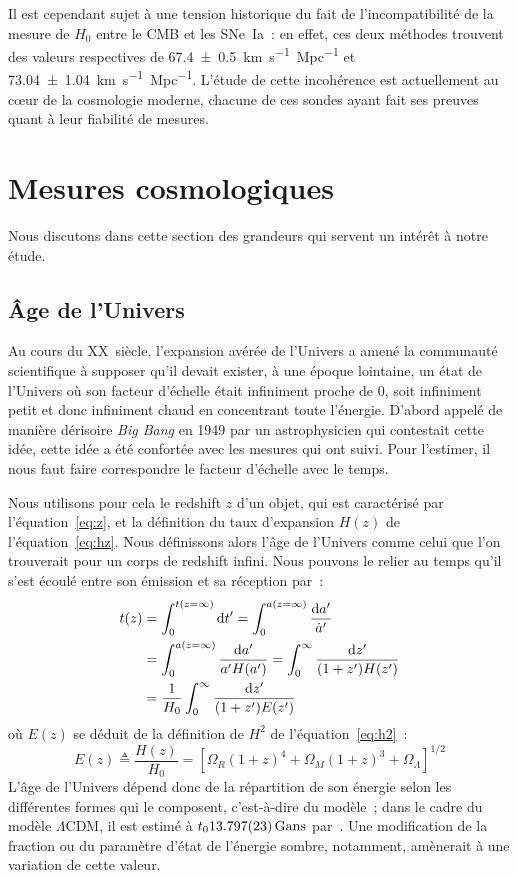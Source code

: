 \documentclass[../main/main.tex]{subfiles}
\begin{document}
Il est cependant sujet à une tension historique du fait de l'incompatibilité de
la mesure de $H_0$ entre le CMB et les SNe~Ia~: en effet, ces deux méthodes
trouvent des valeurs respectives de \SI{67.4\pm0.5}{km.s^{-1}.Mpc^{-1}} et
\SI{73.04\pm1.04}{km.s^{-1}.Mpc^{-1}}. L'étude de cette incohérence est
actuellement au cœur de la cosmologie moderne, chacune de ces sondes ayant fait
ses preuves quant à leur fiabilité de mesures.

\section{Mesures cosmologiques}\label{sec:dist}

Nous discutons dans cette section des grandeurs qui servent un intérêt à notre
étude.

\subsection{Âge de l'Univers}\label{ssec:age}

Au cours du XX\ieme~siècle, l'expansion avérée de l'Univers a amené la
communauté scientifique à supposer qu'il devait exister, à une époque lointaine,
un état de l'Univers où son facteur d'échelle était infiniment proche de 0, soit
infiniment petit et donc infiniment chaud en concentrant toute l'énergie.
D'abord appelé de manière dérisoire \textit{Big Bang} en 1949 par un
astrophysicien qui contestait cette idée, cette idée a été confortée avec les
mesures qui ont suivi. Pour l'estimer, il nous faut faire correspondre le
facteur d'échelle avec le temps.

Nous utilisons pour cela le redshift $z$ d'un objet, qui est caractérisé par
l'équation~\ref{eq:z}, et la définition du taux d'expansion $H(z)$ de
l'équation~\ref{eq:hz}. Nous définissons alors l'âge de l'Univers comme celui
que l'on trouverait pour un corps de redshift infini. Nous pouvons le relier au
temps qu'il s'est écoulé entre son émission et sa réception par~:
\begin{align}
    t(z) & = \int_{0}^{t(z=\infty)} \mathrm{d} t' = \int_{0}^{a(z=\infty)} \frac{\mathrm{d} a'}{\dot{a}'}
    \nonumber\\
         & = \int_{0}^{a(z=\infty)} \frac{\mathrm{d} a'}{a'H(a')} = \int_{0}^{\infty} \frac{\mathrm{d}
         z'}{(1+z')H(z')}\nonumber\\
         & = \frac{1}{H_0} \int_{0}^{\infty} \frac{\mathrm{d} z'}{(1+z')E(z')}
\end{align}
où $E(z)$ se déduit de la définition de $H^2$ de l'équation~\ref{eq:h2}~:
\begin{equation}\label{eq:ez}
    E(z) \triangleq \frac{H(z)}{H_0} = \left[ \Omega_R(1+z)^4 + \Omega_M(1+z)^3
    + \Omega_\Lambda\right]^{1/2}
\end{equation}
L'âge de l'Univers dépend donc de la répartition de son énergie selon les
différentes formes qui le composent, c'est-à-dire du modèle~; dans le cadre du
modèle $\Lambda$CDM, il est estimé à $t_0 \SI{13.797\pm0.023}{Gans}$
par~\cite{planck2018}. Une modification de la fraction ou du paramètre d'état de
l'énergie sombre, notamment, amènerait à une variation de cette valeur.
\end{document}
